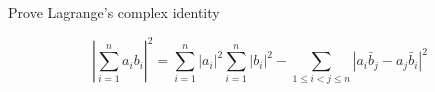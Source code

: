 Prove Lagrange's complex identity

$$|\sum_{i=1}^na_ib_i|^2=\sum_{i=1}^n|a_i|^2\sum_{i=1}^n|b_i|^2-
\sum_{1\leq i<j\leq n}|a_i\bar{b}_j-a_j\bar{b}_i|^2$$

\begin{solution}\renewcommand{\qedsymbol}{}\ \\

    

\end{solution}